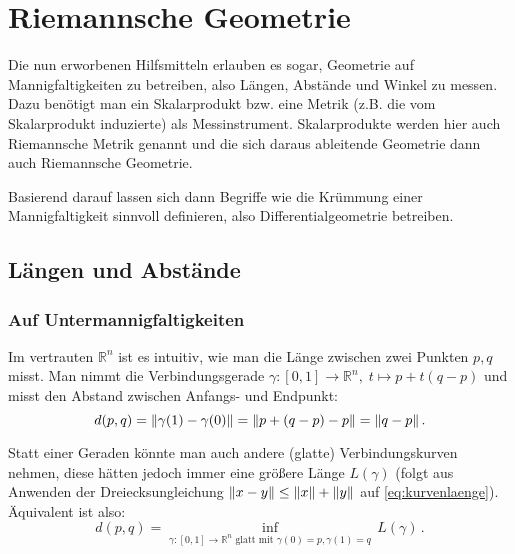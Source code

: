  \graphicspath{ {../} }




\setcounter{chapter}{6}

\chapter{Riemannsche Geometrie}
\begin{center}
Die nun erworbenen Hilfsmitteln erlauben es sogar, Geometrie auf Mannigfaltigkeiten zu betreiben, also Längen, Abstände und Winkel zu messen. Dazu benötigt man ein Skalarprodukt bzw. eine Metrik (z.B. die vom Skalarprodukt induzierte) als Messinstrument. Skalarprodukte werden hier auch Riemannsche Metrik genannt und die sich daraus ableitende Geometrie dann auch Riemannsche Geometrie.

Basierend darauf lassen sich dann Begriffe wie die Krümmung einer Mannigfaltigkeit sinnvoll definieren, also Differentialgeometrie betreiben.
\end{center}



\newpage


	\section{Längen und Abstände}%
		\subsection{Auf Untermannigfaltigkeiten}%
Im vertrauten $\mathbb{R}^n$ ist es intuitiv, wie man die Länge zwischen zwei Punkten $p, q$ misst. Man nimmt die Verbindungsgerade $\gamma: [0, 1] \rightarrow \mathbb{R}^n, \; t \mapsto p + t (q - p)$ und misst den Abstand zwischen Anfangs- und Endpunkt:
\begin{equation}
d(p, q) = \norm{\gamma(1) - \gamma(0)} = \norm{p + (q - p) - p} = \norm{q - p} \, .
\end{equation}

Statt einer Geraden könnte man auch andere (glatte) Verbindungskurven nehmen, diese hätten jedoch immer eine größere Länge $L(\gamma)$ (folgt aus Anwenden der Dreiecksungleichung $\norm{x - y} \leq \norm{x} + \norm{y}$ auf \eqref{eq:kurvenlaenge}). Äquivalent ist also:
\begin{equation}\label{eq:metrik_kurve}
d(p, q) = \inf_{\gamma: [0, 1] \rightarrow \mathbb{R}^n \text{ glatt mit } \gamma(0) = p, \gamma(1) = q} \, L(\gamma) \, .
\end{equation}


